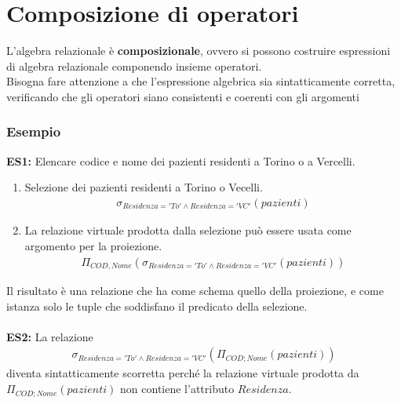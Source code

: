 \section{Composizione di operatori}
L'algebra relazionale è \textbf{composizionale}, ovvero si possono costruire espressioni di algebra relazionale componendo insieme operatori.\\
Bisogna fare attenzione a che l'espressione algebrica sia sintatticamente corretta, verificando che gli operatori siano consistenti e coerenti con gli argomenti

\subsubsection{Esempio}
\textbf{ES1:} Elencare codice e nome dei pazienti residenti a Torino o a Vercelli.
\begin{enumerate}
    \item{Selezione dei pazienti residenti a Torino o Vecelli.
        \begin{equation}\begin{aligned}
            \sigma_{Residenza = 'To' \wedge Residenza = 'VC'}(pazienti)
        \end{aligned}\end{equation}}
    \item{La relazione virtuale prodotta dalla selezione può essere usata come argomento per la proiezione.
        \begin{equation}\begin{aligned}
            \Pi_{COD, Nome}(\sigma_{Residenza = 'To' \wedge Residenza = 'VC'}(pazienti))
        \end{aligned}\end{equation}}
\end{enumerate}
Il risultato è una relazione che ha come schema quello della proiezione, e come istanza solo le tuple che soddisfano il predicato della selezione.\\\\
\textbf{ES2:} La relazione 
    \begin{equation}\begin{aligned}
        \sigma_{Residenza = 'To' \wedge Residenza = 'VC'}(\Pi_{COD; Nome}(pazienti))
    \end{aligned}\end{equation}
diventa sintatticamente scorretta perché la relazione virtuale prodotta da $\Pi_{COD; Nome}(pazienti)$ non contiene l'attributo $Residenza$.

